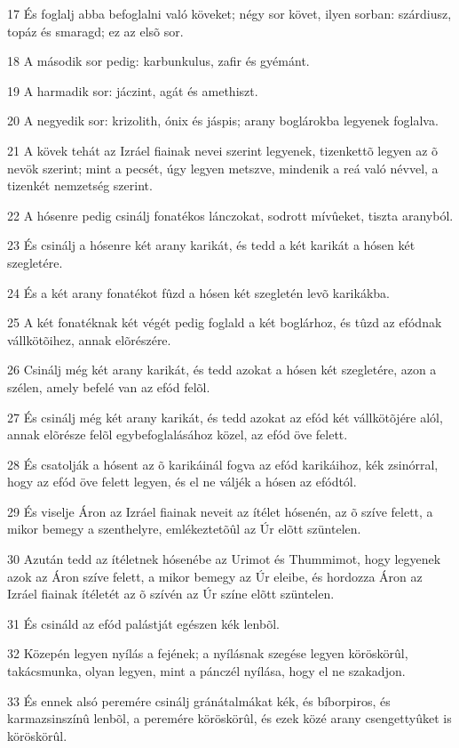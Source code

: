 \par 17 És foglalj abba befoglalni való köveket; négy sor követ, ilyen sorban: szárdiusz, topáz és smaragd; ez az elsõ sor.
\par 18 A második sor pedig: karbunkulus, zafir és gyémánt.
\par 19 A harmadik sor: jáczint, agát és amethiszt.
\par 20 A negyedik sor: krizolith, ónix és jáspis; arany boglárokba legyenek foglalva.
\par 21 A kövek tehát az Izráel fiainak nevei szerint legyenek, tizenkettõ legyen az õ nevök szerint; mint a pecsét, úgy legyen metszve, mindenik a reá való névvel, a tizenkét nemzetség szerint.
\par 22 A hósenre pedig csinálj fonatékos lánczokat, sodrott mívûeket, tiszta aranyból.
\par 23 És csinálj a hósenre két arany karikát, és tedd a két karikát a hósen két szegletére.
\par 24 És a két arany fonatékot fûzd a hósen két szegletén levõ karikákba.
\par 25 A két fonatéknak két végét pedig foglald a két boglárhoz, és tûzd az efódnak vállkötõihez, annak elõrészére.
\par 26 Csinálj még két arany karikát, és tedd azokat a hósen két szegletére, azon a szélen, amely befelé van az efód felõl.
\par 27 És csinálj még két arany karikát, és tedd azokat az efód két vállkötõjére alól, annak elõrésze felõl egybefoglalásához közel, az efód öve felett.
\par 28 És csatolják a hósent az õ karikáinál fogva az efód karikáihoz, kék zsinórral, hogy az efód öve felett legyen, és el ne váljék a hósen az efódtól.
\par 29 És viselje Áron az Izráel fiainak neveit az ítélet hósenén, az õ szíve felett, a mikor bemegy a szenthelyre, emlékeztetõûl az Úr elõtt szüntelen.
\par 30 Azután tedd az ítéletnek hósenébe az Urimot és Thummimot, hogy legyenek azok az Áron szíve felett, a mikor bemegy az Úr eleibe, és hordozza Áron az Izráel fiainak ítéletét az õ szívén az Úr színe elõtt szüntelen.
\par 31 És csináld az efód palástját egészen kék lenbõl.
\par 32 Közepén legyen nyílás a fejének; a nyílásnak szegése legyen köröskörûl, takácsmunka, olyan legyen, mint a pánczél nyílása, hogy el ne szakadjon.
\par 33 És ennek alsó peremére csinálj gránátalmákat kék, és bíborpiros, és karmazsinszínû lenbõl, a peremére köröskörûl, és ezek közé arany csengettyûket is köröskörûl.
